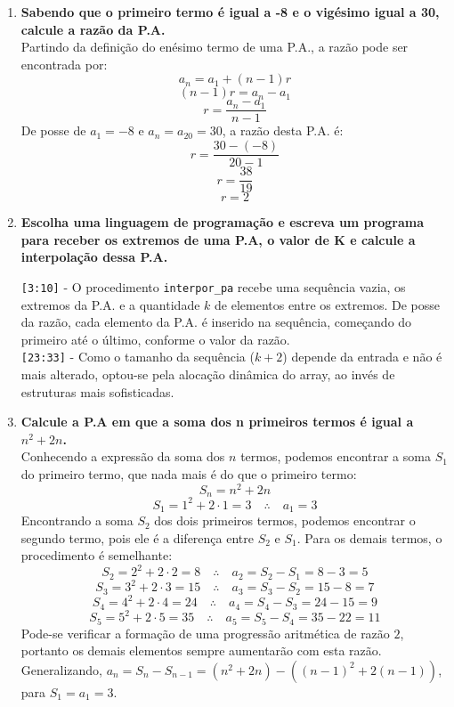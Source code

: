 \begin{enumerate}
	\item \textbf{Sabendo que o primeiro termo é igual a -8 e o vigésimo igual a 30, calcule a razão da P.A.}\\
	Partindo da definição do enésimo termo de uma P.A., a razão pode ser encontrada por:
	$$ a_n = a_1 + (n-1)r $$
	$$ (n-1)r = a_n - a_1 $$
	$$ r = \frac{a_n - a_1}{n-1} $$
	De posse de $a_1 = -8$ e $a_n = a_{20} = 30$, a razão desta P.A. é:
	$$ r = \frac{30 - (-8)}{20-1} $$
	$$ r = \frac{38}{19} $$
	$$ r = 2 $$
	
	\pagebreak
	\item \textbf{Escolha uma linguagem de programação e escreva um programa para receber os extremos de uma P.A, o valor de K e calcule a interpolação dessa P.A.}
	
	\verb|[3:10]| - O procedimento \verb|interpor_pa| recebe uma sequência vazia, os extremos da P.A. e a quantidade $k$ de elementos entre os extremos. De posse da razão, cada elemento da P.A. é inserido na sequência, começando do primeiro até o último, conforme o valor da razão.\\
	\verb|[23:33]| - Como o tamanho da sequência ($k+2$) depende da entrada e não é mais alterado, optou-se pela alocação dinâmica do array, ao invés de estruturas mais sofisticadas.
		
	\item \textbf{Calcule a P.A em que a soma dos n primeiros termos é igual a $n^2 + 2n$.}\\
	Conhecendo a expressão da soma dos $n$ termos, podemos encontrar a soma $S_1$ do primeiro termo, que nada mais é do que o primeiro termo:
	$$ S_n = n^2 + 2n$$
	$$ S_1 = 1^2 + 2 \cdot 1 = 3 \quad \therefore \quad a_1 = 3 $$
	Encontrando a soma $S_2$ dos dois primeiros termos, podemos encontrar o segundo termo, pois ele é a diferença entre $S_2$ e $S_1$. Para os demais termos, o procedimento é semelhante:
	$$ S_2 = 2^2 + 2 \cdot 2 = 8 \quad \therefore \quad a_2 = S_2 - S_1 = 8 - 3 = 5 $$
	$$ S_3 = 3^2 + 2 \cdot 3 = 15 \quad \therefore \quad a_3 = S_3 - S_2 = 15 - 8 = 7 $$
	$$ S_4 = 4^2 + 2 \cdot 4 = 24 \quad \therefore \quad a_4 = S_4 - S_3 = 24 - 15 = 9 $$
	$$ S_5 = 5^2 + 2 \cdot 5 = 35 \quad \therefore \quad a_5 = S_5 - S_4 = 35 - 22 = 11 $$
	Pode-se verificar a formação de uma progressão aritmética de razão $2$, portanto os demais elementos sempre aumentarão com esta razão.\\
	Generalizando, $a_n = S_n - S_{n-1} = (n^2 + 2n) - ((n-1)^2 + 2(n-1))$, para $S_1 = a_1 = 3$.
	

\end{enumerate}
